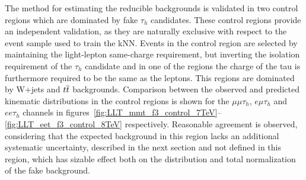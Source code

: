 The method for estimating the reducible backgrounds is validated in two control regions which are dominated by fake $\tau_h$ candidates.
These control regions provide an independent validation, as they are naturally exclusive with respect to the event sample used to train the kNN. Events in the control region are selected by maintaining
the light-lepton same-charge requirement, but inverting the isolation requirement of the $\tau_h$ candidate and in one of the regions the charge of the tau is furthermore required to be the same as the leptons.
This regions are dominated by W+jets and $t\overline{t}$ backgrounds.
Comparison between the observed and predicted kinematic distributions in the control regions is shown for the $\mu\mu\tau_h$, $e\mu\tau_h$ and $ee\tau_h$ channels in figures~\ref{fig:LLT_mmt_f3_control_7TeV}--\ref{fig:LLT_eet_f3_control_8TeV} respectively.
Reasonable agreement is observed, considering that the expected background in this region lacks an additional systematic uncertainty, described in the next section and not defined in this region, which has sizable effect both on the distribution and total normalization of the fake background.

